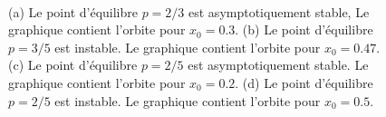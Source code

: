 {\begin{figure}
\centering
{}
\qquad
{}
\\
\qquad
{}
\caption[Types de stabilité pour le point d'équilibre d'un
système dynamique discret de la forme $x_{n+1} = m x_n + b$]
{(a) Le point d'équilibre $p=2/3$ est asymptotiquement stable,  Le
  graphique contient l'orbite pour $x_0 = 0.3$.
(b) Le point d'équilibre $p=3/5$ est instable.  Le graphique contient
l'orbite pour $x_0 = 0.47$.
(c) Le point d'équilibre $p=2/5$ est asymptotiquement stable.  Le
graphique contient l'orbite pour $x_0 =0.2$.
(d) Le point d'équilibre $p=2/5$ est instable.  Le graphique contient
l'orbite pour $x_0 = 0.5$.}\label{AFFINE1-4}
\end{figure}

}
